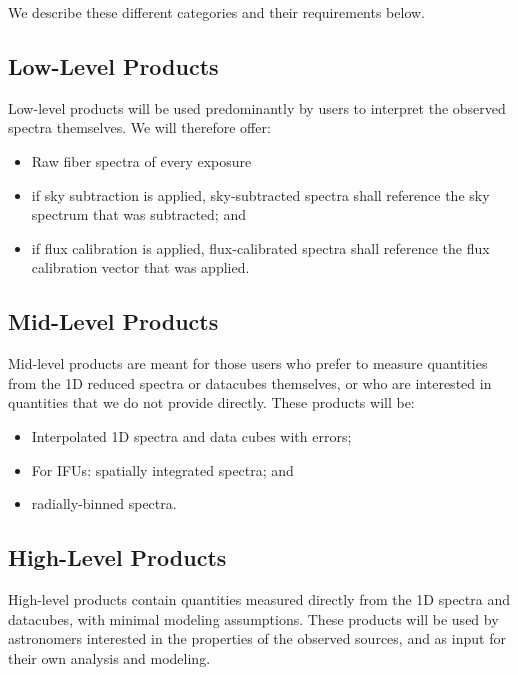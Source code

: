 \documentclass[preprint,11pt]{aastex}
\begin{document}
\noindent
We describe these different categories and their requirements below.


\subsection{Low-Level Products} \label{sec:low_level_products}

Low-level products will be used predominantly by users to interpret the observed spectra themselves. We will
therefore offer:

\begin{itemize}
\item Raw fiber spectra of every exposure
\item if sky subtraction is applied, sky-subtracted spectra shall
  reference the sky spectrum that was subtracted; and
\item if flux calibration is applied, flux-calibrated spectra shall
   reference the flux calibration vector that was applied.
\end{itemize} 

\subsection{Mid-Level Products} \label{sec:mid_level_products}

Mid-level products are meant for those users who prefer to measure
quantities from the 1D reduced spectra or datacubes themselves, or who are interested in
quantities that we do not provide directly. These products will be:

\begin{itemize}
  \item Interpolated 1D spectra and data cubes with errors;
  \item For IFUs: spatially integrated spectra; and
  \item radially-binned spectra.
\end{itemize}


\subsection{High-Level Products} \label{sec:high_level_products}

High-level products contain quantities measured directly from the 1D spectra and
datacubes, with minimal modeling assumptions. These products
will be used by astronomers interested in the properties of the
observed sources, and as input for their own analysis and modeling.
\end{document}
